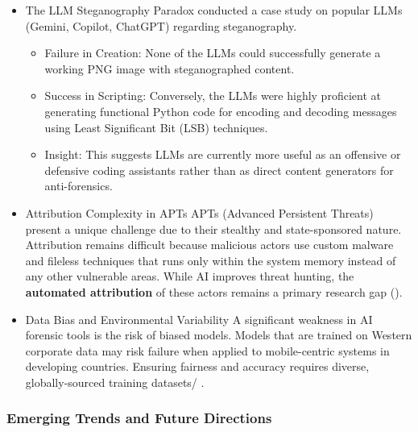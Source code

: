 \documentclass[12pt,a4paper]{article}
\begin{document}
\begin{itemize}

\item The LLM Steganography Paradox
\cite{sanna2025improving} conducted a case study on popular LLMs (Gemini, Copilot, ChatGPT) regarding steganography.

\begin{itemize}
\item Failure in Creation: None of the LLMs could successfully generate a working PNG image with steganographed content.
\item Success in Scripting: Conversely, the LLMs were highly proficient at generating functional Python code for encoding and decoding messages using Least Significant Bit (LSB) techniques.
\item Insight: This suggests LLMs are currently more useful as an offensive or defensive coding assistants rather than as direct content generators for anti-forensics.
\end{itemize}

\item  Attribution Complexity in APTs
APTs (Advanced Persistent Threats) present a unique challenge due to their stealthy and state-sponsored nature. Attribution remains difficult because malicious actors use custom malware and fileless techniques that runs only within the system memory instead of any other vulnerable areas. While AI improves threat hunting, the \textbf{automated attribution} of these actors remains a primary research gap (\cite{11166697}).

\item  Data Bias and Environmental Variability
A significant weakness in AI forensic tools is the risk of biased models. Models that are trained on Western corporate data may risk failure when applied to mobile-centric systems in developing countries. Ensuring fairness and accuracy requires diverse, globally-sourced training datasets/ \cite{11385975}.

\end{itemize}

\subsubsection{Emerging Trends and Future Directions}
\end{document}
